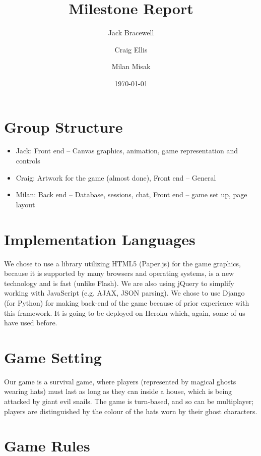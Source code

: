 \documentclass[a4wide, 11pt]{article}
\begin{document}
\title{Milestone Report}

\author{Jack Bracewell \and Craig Ellis \and Milan Misak}

\date{\today}         %

\maketitle            %

\section{Group Structure}

\begin{itemize}
	\item Jack: Front end -- Canvas graphics, animation, game representation and controls
	\item Craig: Artwork for the game (almost done), Front end -- General
	\item Milan: Back end -- Database, sessions, chat, Front end -- game set up, page layout
\end{itemize}


\section{Implementation Languages}

We chose to use a library utilizing HTML5 (Paper.js) for the game graphics, because it is supported by many browsers and operating systems, is a new technology and is fast (unlike Flash). We are also using jQuery to simplify working with JavaScript (e.g. AJAX, JSON parsing). We chose to use Django (for Python) for making back-end of the game because of prior experience with this framework. It is going to be deployed on Heroku which, again, some of us have used before.

\section{Game Setting}

Our game is a survival game, where players (represented by magical ghosts wearing hats) must last as long as they can inside a house, which is being attacked by giant evil snails. The game is turn-based, and so can be multiplayer; players are distinguished by the colour of the hats worn by their ghost characters.

\section{Game Rules}
\end{document}
